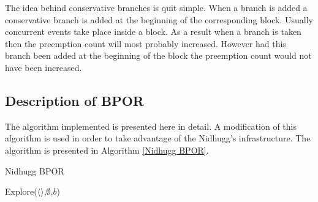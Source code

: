 The idea behind conservative branches is quit simple. When a branch is added a conservative branch is added at the beginning of the corresponding block.
Usually concurrent events take place inside a block. As a result when a branch is taken then the preemption count will most probably increased. However had this
branch been added at the beginning of the block the preemption count would not have been increased. 

\subsection{Description of BPOR}
The algorithm implemented is presented here \cite{BPOR} in detail. A modification of this algorithm is used in order to take advantage of the Nidhugg's infrastructure.
The algorithm is presented in Algorithm \ref{Nidhugg BPOR}.


\begin{algorithm}
    \caption{Nidhugg BPOR}
    \label{Nidhugg BPOR}
    Explore($\langle \rangle$,$\emptyset$,$b$)\;
\end{algorithm}

